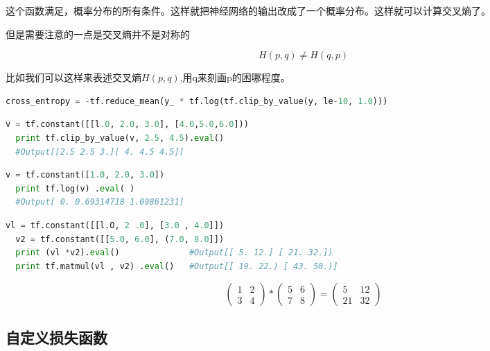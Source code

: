 \documentclass{article}\usepackage{float}\usepackage{listings} \usepackage{braket} \usepackage{amsmath,amssymb} \usepackage{geometry} \usepackage{graphicx} \usepackage{fancyvrb}\usepackage{braket} \usepackage{bm}\usepackage{hyperref} \usepackage{CJKutf8} \geometry{left=0.2cm,right=0.2cm,top=0.2cm,bottom=0.2cm} \renewcommand{\theequation}{\arabic{section}.\arabic{equation}} \renewcommand{\baselinestretch}{1.5}
\begin{document}
\begin{CJK}{UTF8}{gbsn}
这个函数满足，概率分布的所有条件。这样就把神经网络的输出改成了一个概率分布。这样就可以计算交叉熵了。

但是需要注意的一点是交叉熵并不是对称的

\begin{displaymath}
  H(p,q)\neq H(q,p)
\end{displaymath}

比如我们可以这样来表述交叉熵$H(p,q)$,用q来刻画p的困哪程度。

\begin{lstlisting}[language=python]
  cross_entropy = -tf.reduce_mean(y_ * tf.log(tf.clip_by_value(y, le-10, 1.0)))
\end{lstlisting}

\begin{lstlisting}[language=python]
  v = tf.constant([[l.0, 2.0, 3.0], [4.0,5.0,6.0])) 
  print tf.clip_by_value(v, 2.5, 4.5).eval() 
  #Output[[2.5 2.5 3.][ 4. 4.5 4.5]]
\end{lstlisting}

\begin{lstlisting}[language=python]
  v = tf.constant([1.0, 2.0, 3.0]) 
  print tf.log(v) .eval( )
  #Output[ 0. 0.69314718 1.09861231]
\end{lstlisting}

\begin{lstlisting}[language=python]
  vl = tf.constant([[l.O, 2 .0], [3.0 , 4.0]]) 
  v2 = tf.constant([[5.0, 6.0], (7.0, 8.0]])
  print (vl *v2).eval()              #Output[[ 5. 12.] [ 21. 32.])
  print tf.matmul(vl , v2) .eval()   #Output[[ 19. 22.) [ 43. 50.)]
\end{lstlisting}

\begin{displaymath}
  \left(
    \begin{array}{cc}
      1 & 2 \\
      3 & 4 
    \end{array}
  \right)*\left(
    \begin{array}{cc}
      5 & 6 \\
      7 & 8 
    \end{array}
  \right)=\left(
    \begin{array}{cc}
      5 & 12 \\
      21 & 32 
    \end{array}
  \right)
\end{displaymath}



\subsection{自定义损失函数}
\label{sec:org2b3e954}


\end{CJK}
\end{document}
